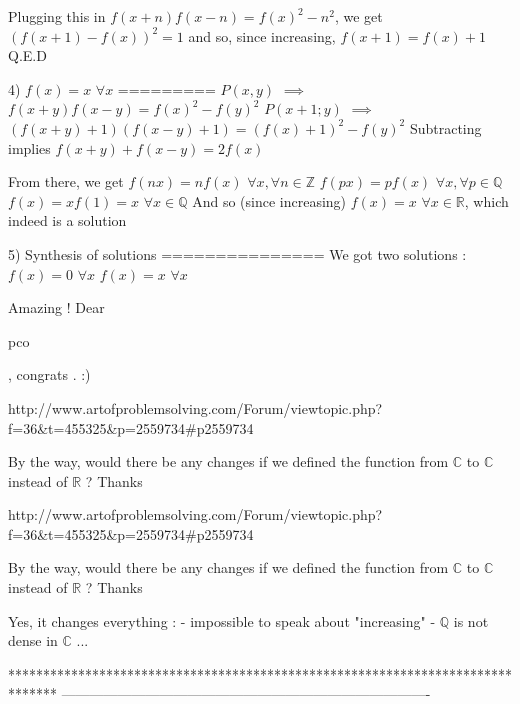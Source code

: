 \begin{solution}
Plugging this in $f(x+n)f(x-n)=f(x)^2-n^2$, we get $(f(x+1)-f(x))^2=1$ and so, since increasing, $f(x+1)=f(x)+1$
Q.E.D

4) $f(x)=x$ $\forall x$
=========
$P(x,y)$ $\implies$ $f(x+y)f(x-y)=f(x)^2-f(y)^2$
$P(x+1;y)$ $\implies$ $(f(x+y)+1)(f(x-y)+1)=(f(x)+1)^2-f(y)^2$
Subtracting implies $f(x+y)+f(x-y)=2f(x)$

From there, we get 
$f(nx)=nf(x)$ $\forall x,\forall n\in\mathbb Z$
$f(px)=pf(x)$ $\forall x,\forall p\in\mathbb Q$
$f(x)=xf(1)=x$ $\forall x\in\mathbb Q$
And so (since increasing) $f(x)=x$ $\forall x\in\mathbb R$, which indeed is a solution

5) Synthesis of solutions
===============
We got two solutions :
$f(x)=0$ $\forall x$
$f(x)=x$ $\forall x$
\end{solution}



\begin{solution}
	Amazing ! Dear \begin{bolded}pco\end{bolded} , congrats . :)
\end{solution}



\begin{solution}
	http://www.artofproblemsolving.com/Forum/viewtopic.php?f=36&t=455325&p=2559734#p2559734

By the way, would there be any changes if we defined the function from $\mathbb{C}$ to $\mathbb{C}$ instead of $\mathbb{R}$ ?
Thanks
\end{solution}



\begin{solution}
	\begin{tcolorbox}http://www.artofproblemsolving.com/Forum/viewtopic.php?f=36&t=455325&p=2559734#p2559734

By the way, would there be any changes if we defined the function from $\mathbb{C}$ to $\mathbb{C}$ instead of $\mathbb{R}$ ?
Thanks\end{tcolorbox}
Yes, it changes everything :
- impossible to speak about "increasing"
- $\mathbb Q$ is not dense in $\mathbb C$
...
\end{solution}
*******************************************************************************
-------------------------------------------------------------------------------

